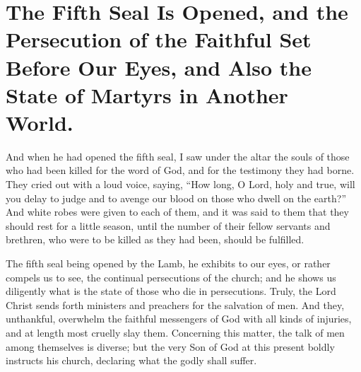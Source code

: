 \chapter[Sermon 32. The Fifth Seal Is Opened, and the Persecution of the Faithful Set Before Our Eyes, and Also the State of Martyrs in Another World.]{The Fifth Seal Is Opened, and the Persecution of the Faithful Set Before Our Eyes, and Also the State of Martyrs in Another World.}
\label{sermon:032}

And when he had opened the fifth seal, I saw under the altar the souls of those who had been killed for the word of God, and for the testimony they had borne. They cried out with a loud voice, saying, “How long, O Lord, holy and true, will you delay to judge and to avenge our blood on those who dwell on the earth?” And white robes were given to each of them, and it was said to them that they should rest for a little season, until the number of their fellow servants and brethren, who were to be killed as they had been, should be fulfilled.

The fifth seal being opened by the Lamb, he exhibits to our eyes, or rather compels us to see, the continual persecutions of the church; and he shows us diligently what is the state of those who die in persecutions. Truly, the Lord Christ sends forth ministers and preachers for the salvation of men. And they, unthankful, overwhelm the faithful messengers of God with all kinds of injuries, and at length most cruelly slay them. Concerning this matter, the talk of men among themselves is diverse; but the very Son of God at this present boldly instructs his church, declaring what the godly shall suffer.

